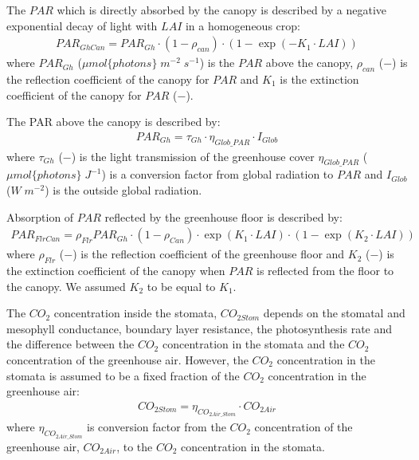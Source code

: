 \documentclass[a4paper]{article}
\begin{document}
The \(PAR\) which is directly absorbed by the canopy is described by a negative exponential decay of light with \(LAI\) in a homogeneous crop:
\begin{align}
  PAR_{GhCan} = PAR_{Gh}\cdot (1-\rho_{can})\cdot(1 - \exp \left(-K_1\cdot LAI\right))
\end{align}
where \(PAR_{Gh}\) (\(\mu mol \{photons\}\;m^{-2}\;s^{-1}\)) is the \(PAR\) above the canopy, \(\rho_{can}\) (\(-\)) is the reflection coefficient of the canopy for \(PAR\) and \(K_1\) is the extinction coefficient of the canopy for \(PAR\) (\(-\)).

The PAR above the canopy is described by:
\begin{align}
  PAR_{Gh} = \tau_{Gh} \cdot \eta_{Glob\_PAR}\cdot I_{Glob}
\end{align}
where \(\tau_{Gh}\) (\(-\)) is the light transmission of the greenhouse cover \(\eta_{Glob\_PAR}\) (\(\mu mol\{photons\}\;J^{-1}\)) is a conversion factor from global radiation to \(PAR\) and \(I_{Glob}\) (\(W\;m^{-2}\)) is the outside global radiation.

Absorption of \(PAR\) reflected by the greenhouse floor is described by:
\begin{align}
  PAR_{FlrCan} = \rho_{Flr}PAR_{Gh}\cdot (1-\rho_{Can})\cdot \exp \left(K_1\cdot LAI\right) \cdot (1 - \exp \left(K_2\cdot LAI\right))
\end{align}
where \(\rho_{Flr}\) (\(-\)) is the reflection coefficient of the greenhouse floor and \(K_2\) (\(-\)) is the extinction coefficient of the canopy when \(PAR\) is reflected from the floor to the canopy. We assumed \(K_2\) to be equal to \(K_1\).

The \(CO_2\) concentration inside the stomata, \(CO_{2Stom}\) depends on the stomatal and mesophyll conductance, boundary layer resistance, the photosynthesis rate and the difference between the \(CO_2\) concentration in the stomata and the \(CO_2\) concentration of the greenhouse air. However, the \(CO_2\) concentration in the stomata is assumed to be a fixed fraction of the \(CO_2\) concentration in the greenhouse air:
\begin{align}
  CO_{2Stom} = \eta_{CO_{2Air\_Stom}} \cdot CO_{2Air}
\end{align}
where \(\eta_{CO_{2Air\_Stom}}\) is conversion factor from the \(CO_2\) concentration of the greenhouse air, \(CO_{2Air}\), to the \(CO_2\) concentration in the stomata.
\end{document}
